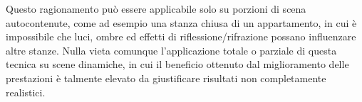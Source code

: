 Questo ragionamento può essere applicabile solo su porzioni di scena autocontenute, come ad esempio una stanza chiusa di un appartamento, in cui è impossibile che luci, ombre ed effetti di riflessione/rifrazione possano influenzare altre stanze.
Nulla vieta comunque l’applicazione totale o parziale di questa tecnica su scene dinamiche, in cui il beneficio ottenuto dal miglioramento delle prestazioni è talmente elevato da giustificare  risultati non completamente realistici. 